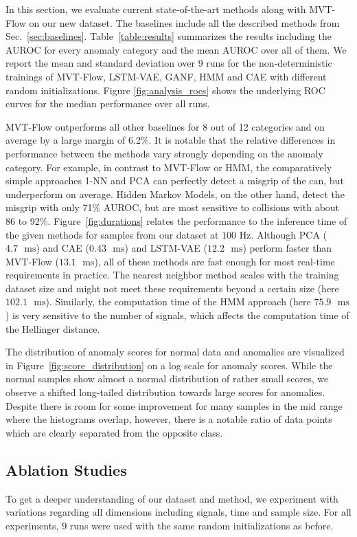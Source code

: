 \documentclass[journal]{IEEEtran}
\begin{document}
In this section, we evaluate current state-of-the-art methods along with MVT-Flow on our new dataset.
The baselines include all the described methods from Sec.~\ref{sec:baselines}.
Table~\ref{table:results} summarizes the results including the AUROC for every anomaly category and the mean AUROC over all of them.
We report the mean and standard deviation over 9 runs {for the non-deterministic trainings of MVT-Flow, LSTM-VAE, GANF, HMM and CAE with different random initializations.}
Figure \ref{fig:analysis_rocs} shows the underlying ROC curves for the median performance over all runs.

{MVT-Flow outperforms all other baselines for 8 out of 12 categories and {on average} by a large margin of 6.2\%.
It is notable that the relative differences in performance between the methods vary strongly depending on the anomaly category.
For example, in contrast to MVT-Flow or HMM, the comparatively simple approaches 1-NN and PCA can perfectly detect a misgrip of the can, but underperform on average.
Hidden Markov Models, on the other hand, detect the misgrip with only 71\% AUROC, but are most sensitive to collisions with about 86 to 92\%.
\newcommand\ms{\text{ }\mathrm{ms}}
Figure~\ref{fig:durations} relates the performance to the inference time of the given methods for samples from our dataset at $100$ Hz.
Although PCA ($4.7\ms$) and CAE ($0.43\ms$) and LSTM-VAE ($12.2\ms$) perform faster than MVT-Flow ($13.1\ms$), all of these methods are fast enough for most real-time requirements in practice.
The nearest neighbor method scales with the training dataset size and might not meet these requirements beyond a certain size (here $102.1 \ms$).
Similarly, the computation time of the HMM approach (here $75.9\ms$) is very sensitive to the number of signals, which affects the computation time of the Hellinger distance.}

The distribution of anomaly scores for normal data and anomalies are visualized in Figure~\ref{fig:score_distribution} on a log scale for anomaly scores.
While the normal samples show almost a normal distribution of rather small scores, we observe a shifted long-tailed distribution towards large scores for anomalies.
Despite there is room for some improvement for many samples in the mid range where the histograms overlap, however, there is a notable ratio of data points which are clearly separated from the opposite class.



\subsection{Ablation Studies}
\label{ablations}
To get a deeper understanding of our dataset and method, we experiment with variations regarding all dimensions including signals, time and sample size.
For all experiments, 9 runs were used with the same random initializations as before.
\end{document}
